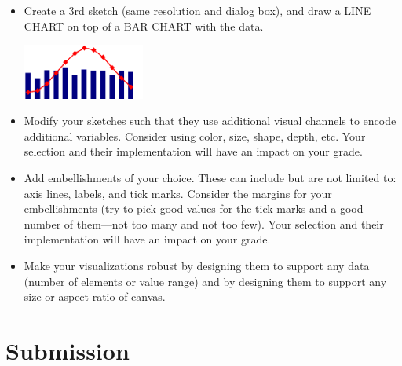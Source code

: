\documentclass[a4paper,12pt]{article}
\begin{document}
\begin{itemize}
\item Create a 3rd sketch (same resolution and dialog box), and draw a LINE CHART on top of a BAR CHART with the data.

\begin{center}
\includegraphics[width=4cm]{../images/bar_and_line_chart.png}
\end{center}


\item Modify your sketches such that they use additional visual channels to encode additional variables. Consider using color, size, shape, depth, etc. Your selection and their implementation will have an impact on your grade.

\item Add embellishments of your choice. These can include but are not limited to: axis lines, labels, and tick marks. Consider the margins for your embellishments (try to pick good values for the tick marks and a good number of them---not too many and not too few). Your selection and their implementation will have an impact on your grade.

\item Make your visualizations robust by designing them to support any data (number of elements or value range) and by designing them to support any size or aspect ratio of canvas.

\end{itemize}


\section{Submission}




\end{document}

